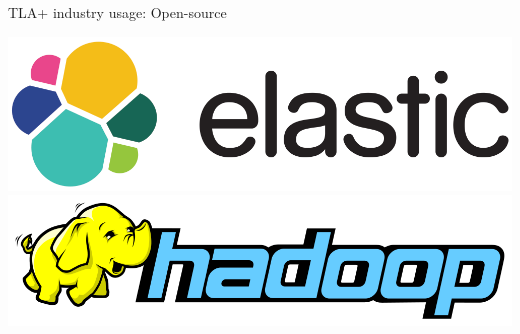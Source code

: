 \documentclass[12pt]{beamer}
\begin{document}
\begin{frame}{TLA+ industry usage: Open-source}
\begin{center}
    \end{center}
    \begin{center}
        \includegraphics[scale=0.12]{figures/elastic}
        \includegraphics[scale=0.14]{figures/hadoop}
    \end{center}
  \end{frame}
\end{document}
